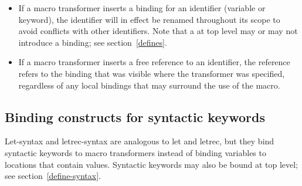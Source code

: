 \begin{itemize}

\item If a macro transformer inserts a binding for an identifier
(variable or keyword), the identifier will in effect be renamed
throughout its scope to avoid conflicts with other identifiers.
Note that a  at top level may or may not introduce a binding;
see section~\ref{defines}.

\item If a macro transformer inserts a free reference to an
identifier, the reference refers to the binding that was visible
where the transformer was specified, regardless of any local
bindings that may surround the use of the macro.

\end{itemize}



\subsection{Binding constructs for syntactic keywords}
\label{bindsyntax}

{\cf Let-syntax} and {\cf letrec-syntax} are
analogous to {\cf let} and {\cf letrec}, but they bind
syntactic keywords to macro transformers instead of binding variables
to locations that contain values.  Syntactic keywords may also be
bound at top level; see section~\ref{define-syntax}.

